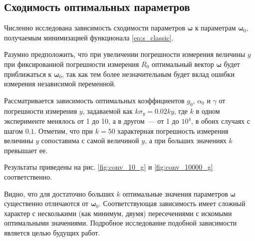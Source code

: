\documentclass[11pt,a4paper]{article}
\begin{document}
\subsection{Сходимость оптимальных параметров}
Численно исследована зависимость сходимости параметров $\boldsymbol{\omega}$ к параметрам
$\boldsymbol{\omega}_0$, получаемым минимизацией функционала \eqref{eq:s_classic}.

Разумно предположить, что при увеличении погрешности измерения величины $y$ при
фиксированной погрешности измерения $R_0$ оптимальный вектор $\boldsymbol{\omega}$
будет приближаться к $\boldsymbol{\omega}_0$, так как тем более незначительным
будет вклад ошибки измерения независимой переменной.

Рассматривается зависимость оптимальных коэффициентов $g_0$, $\alpha_0$ и $\gamma$ от
погрешности измерения $y$, задаваемой как $k \sigma_y = 0.02ky$, где $k$ в одном эксперименте
менялось от 1 до 10, а в другом~--- от 1 до $10^4$, в обоих случаях с шагом $0.1$.
Отметим, что при $k = 50$ характерная погрешность измерения величины $y$ сопоставима с самой
величиной $y$, а при больших значениях $k$ превышает ее.

Результаты приведены на рис. \ref{fig:conv_10_g} и \ref{fig:conv_10000_g} соответственно.

Видно, что для достаточно больших $k$ оптимальные значения параметров $\boldsymbol{\omega}$
существенно отличаются от $\boldsymbol{\omega}_0$. Соответствующая зависимость имеет сложный
характер с несколькими (как минимум, двумя) пересечениями с искомыми оптимальными значениями.
Подробное исследование подобной зависимости является целью будущих работ.
\end{document}
